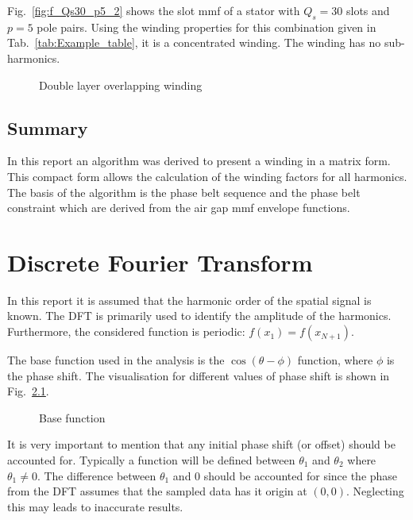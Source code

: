Fig.~\ref{fig:f_Qs30_p5_2} shows the slot mmf of a stator with $Q_s=30$ slots and $p=5$ pole pairs. Using the winding properties for this combination given in Tab.~\ref{tab:Example_table}, it is a concentrated winding. The winding has no sub-harmonics. 
\begin{figure}[htbp]
	\centering
  \fontsize{6}{6}\selectfont
	\hfill
	\caption{Double layer overlapping winding}
	\label{Main_double_overlapping}
\end{figure}

\clearpage
\section{Summary}
In this report an algorithm was derived to present a winding in a matrix form. This compact form allows the calculation of the winding factors for all harmonics. The basis of the algorithm is the phase belt sequence and the phase belt constraint which are derived from the air gap mmf envelope functions. 

\appendix

\chapter{Discrete Fourier Transform}
In this report it is assumed that the harmonic order of the spatial signal is known. The DFT is primarily used to identify the amplitude of the harmonics. Furthermore, the considered function is periodic: $f(x_1)=f(x_{N+1})$.

The base function used in the analysis is the $\cos(\theta-\phi)$ function, where $\phi$ is the phase shift. The visualisation for different values of phase shift is shown in Fig.~\ref{fig:base}.  

\begin{figure}[htbp]
  \centering
  \fontsize{6}{0}\selectfont
  \setlength{}
	\hfill
	\subfloat[$\cos(\theta)$]{
	}
	\hfill
	\caption{Base function}
	\label{fig:base}
\end{figure}

It is very important to mention that any initial phase shift (or offset) should be accounted for. Typically a function will be defined between $\theta_1$ and $\theta_2$ where $\theta_1\neq 0$. The difference between $\theta_1$ and $0$ should be accounted for since the phase from the DFT assumes that the sampled data has it origin at $(0,0)$. Neglecting this may leads to inaccurate results. 

